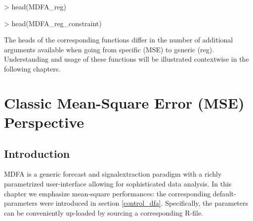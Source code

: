 \documentclass[a4paper]{book}
\begin{document}
\begin{Schunk}
\begin{Soutput}
{6     lambda_decay <- c(0, 0)                                    
\end{Soutput}
\begin{Sinput}
> head(MDFA_reg)
\end{Sinput}
\begin{Soutput}
1 function (L, weight_func, Lag, Gamma, cutoff, lambda, eta, lambda_cross,    
2     lambda_decay, lambda_smooth)                                            
3 {                                                                           
4     lin_eta <- F                                                            
5     weight_constraint <- rep(1/(ncol(weight_func) - 1), ncol(weight_func) - 
6         1)                                                                  
\end{Soutput}
\begin{Sinput}
> head(MDFA_reg_constraint)
\end{Sinput}
\begin{Soutput}
1 function (L, weight_func, Lag, Gamma, cutoff, lambda, eta, lambda_cross,      
2     lambda_decay, lambda_smooth, i1, i2, weight_constraint, shift_constraint) 
3 {                                                                             
4     lin_eta <- F                                                              
5     lin_expweight <- F                                                        
6     grand_mean <- F                                                           
\end{Soutput}
\end{Schunk}
The heads of the corresponding functions differ in the number of additional arguments available when going from specific (MSE) to generic (reg). Understanding and usage of these functions will be illustrated contextwise in the following chapters.






\chapter{Classic Mean-Square Error (MSE) Perspective}\label{mse_sec}

\section{Introduction}

MDFA is a generic forecast and signalextraction paradigm with a richly parametrized user-interface allowing for sophisticated data analysis. In this chapter we emphasize mean-square performances: the corresponding default-parameters were introduced in section \ref{control_dfa}. Specifically, the parameters can be conveniently up-loaded by sourcing a corresponding R-file. \\
\end{document}
